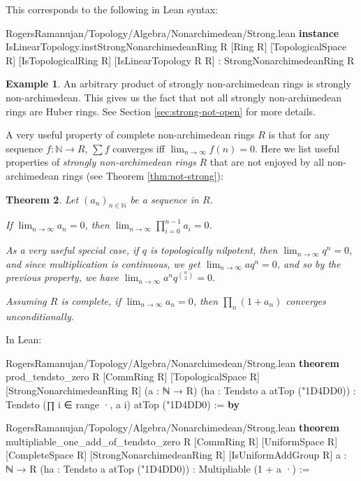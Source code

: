 \documentclass[12pt]{amsart}
\newtheorem{theorem}{Theorem}[subsection]
\theoremstyle{definition}
\newtheorem{example}[theorem]{Example}
\theoremstyle{remark}
\numberwithin{equation}{subsection}
\newcommand{\N}{\mathbb N}
\newcommand{\nhds}{{\char"1D4DD}}
\newcommand{\kw}[1]{\textcolor{keywordcolor}{\textbf{#1}}}
\newcommand{\var}[1]{\textcolor{tacticcolor}{#1}}
\newcommand{\num}[1]{\textcolor{numcolor}{#1}}
\newcommand{\imp}[1]{\textcolor{commentcolor}{\textbraceleft#1\textbraceright}}
\begin{document}
This corresponds to the following in Lean syntax:
\begin{code}{RogersRamanujan/Topology/Algebra/Nonarchimedean/Strong.lean}
\kw{instance} IsLinearTopology.instStrongNonarchimedeanRing \imp{R} [Ring \var{R}] [TopologicalSpace \var{R}]
  [IsTopologicalRing \var{R}] [IsLinearTopology \var{R} \var{R}] : StrongNonarchimedeanRing \var{R}
\end{code}

\begin{example}
An arbitrary product of strongly non-archimedean rings is strongly non-archimedean. This gives us the fact that not all strongly non-archimedean rings are Huber rings. See Section \ref{sec:strong-not-open} for more details.
\end{example}

A very useful property of complete non-archimedean rings $R$ is that for any sequence $f: \N \to R$, $\sum f$ converges iff $\lim_{n \to \infty} f(n) = 0$. Here we list useful properties of \textit{strongly non-archimedean rings} $R$ that are not enjoyed by all non-archimedean rings (see Theorem \ref{thm:not-strong}):

\begin{theorem}\label{thm:strong-prop}
    Let $(a_n)_{n \in \N}$ be a sequence in $R$.

    If $\lim_{n \to \infty} a_n = 0$, then $\lim_{n \to \infty} \prod_{i=0}^{n-1} a_i = 0$.

    As a very useful special case, if $q$ is topologically nilpotent, then $\lim_{n \to \infty} q^n = 0$, and since multiplication is continuous, we get $\lim_{n \to \infty} aq^n = 0$, and so by the previous property, we have $\lim_{n \to \infty} a^n q^{\binom{n}{2}} = 0$.

    Assuming $R$ is complete, if $\lim_{n \to \infty} a_n = 0$, then $\prod_n (1 + a_n)$ converges unconditionally.
\end{theorem}

In Lean:

\begin{code}{RogersRamanujan/Topology/Algebra/Nonarchimedean/Strong.lean}
\kw{theorem} prod_tendsto_zero \imp{R} [CommRing \var{R}] [TopologicalSpace \var{R}] [StrongNonarchimedeanRing \var{R}]
  (\var{a} : ℕ → \var{R}) (\var{ha} : Tendsto \var{a} atTop (\nhds \num{0})) :
  Tendsto (∏ \var{i} ∈ range ·, \var{a} \var{i}) atTop (\nhds \num{0}) := \kw{by}
\end{code}

\begin{code}{RogersRamanujan/Topology/Algebra/Nonarchimedean/Strong.lean}
\kw{theorem} multipliable_one_add_of_tendsto_zero \imp{R} [CommRing \var{R}] [UniformSpace \var{R}]
  [CompleteSpace \var{R}] [StrongNonarchimedeanRing \var{R}] [IsUniformAddGroup \var{R}]
  \imp{a : ℕ → R} (\var{ha} : Tendsto \var{a} atTop (\nhds \num{0})) : Multipliable (\num{1} + \var{a} ·) :=
\end{code}
\end{document}
